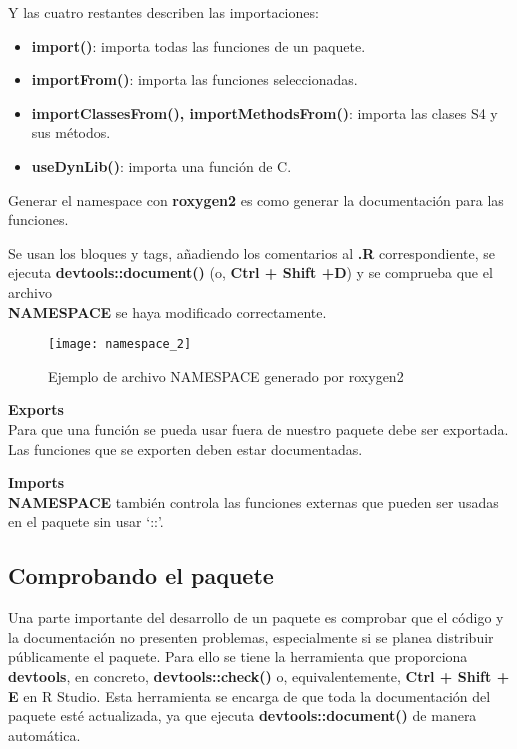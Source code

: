 Y las cuatro restantes describen las importaciones:
\begin{itemize}
    \item \textbf{import()}: importa todas las funciones de un paquete.
    \item \textbf{importFrom()}: importa las funciones seleccionadas.
    \item \textbf{importClassesFrom(), importMethodsFrom()}: importa las clases S4 y sus
m\'etodos.
    \item \textbf{useDynLib()}: importa una funci\'on de C.
\end{itemize}

Generar el namespace con \textbf{roxygen2} es como generar la documentaci\'on para las funciones.

Se usan los bloques y tags, a\~nadiendo los comentarios al \textbf{.R} correspondiente, se ejecuta
\textbf{devtools::document()} (o, \textbf{Ctrl + Shift +D}) y se comprueba que el archivo \\ \textbf{NAMESPACE} se
haya modificado correctamente.\\

\begin{figure}[H]
    \centering
    \texttt{[image: namespace\_2]}
    \caption{Ejemplo de archivo NAMESPACE generado por roxygen2 }
    \label{fig:namespace}
\end{figure} 

\textbf{Exports}\\
Para que una funci\'on se pueda usar fuera de nuestro paquete debe ser exportada. Las funciones que se exporten deben estar documentadas.

\textbf{Imports}\\
\textbf{NAMESPACE} tambi\'en controla las funciones externas que pueden ser usadas en el
paquete sin usar \enquote*{::}.

\subsection{Comprobando el paquete}

Una parte importante del desarrollo de un paquete es comprobar que el c\'odigo y la documentaci\'on no presenten problemas, especialmente si se planea distribuir p\'ublicamente el paquete. Para ello se tiene la herramienta que proporciona \textbf{devtools}, en concreto,
\textbf{devtools::check()} o, equivalentemente, \textbf{Ctrl + Shift + E} en R Studio.
Esta herramienta se encarga de que toda la documentaci\'on del paquete est\'e actualizada, ya que ejecuta \textbf{devtools::document()} de manera autom\'atica.

